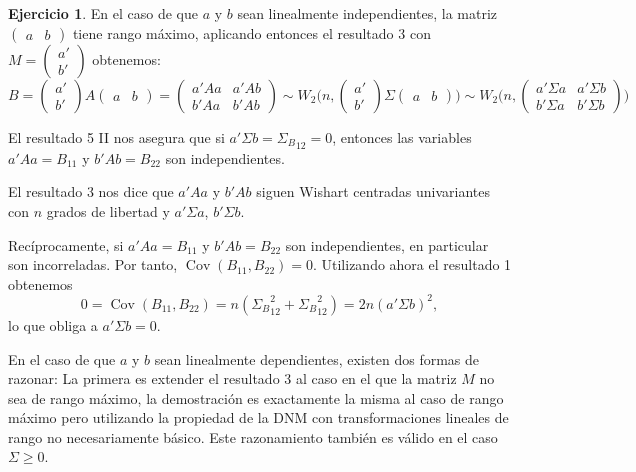 \documentclass[12pt,spanish]{article}
\theoremstyle{definition}
\newtheorem{exercise}{Ejercicio}
\begin{document}
\begin{exercise} %

  En el caso de que $a$ y $b$ sean linealmente independientes, la matriz $
  \begin{pmatrix}
    a & b
  \end{pmatrix}$ tiene rango máximo, aplicando entonces el resultado 3
  con $M=\begin{pmatrix}a' \\ b'\end{pmatrix}$ obtenemos:
  \[B=
    \begin{pmatrix}
      a' \\ b'
    \end{pmatrix} A
    \begin{pmatrix}
      a & b
    \end{pmatrix}=
    \begin{pmatrix}
      a'Aa & a'Ab \\ b'Aa & b'A b
    \end{pmatrix} \sim W_2\Bigg(n,\begin{pmatrix}
      a' \\ b'
    \end{pmatrix} \Sigma
    \begin{pmatrix}
      a & b
    \end{pmatrix}\Bigg)\sim W_2\Bigg(n,\begin{pmatrix}
      a'\Sigma a & a'\Sigma b \\ b'\Sigma a & b'\Sigma b
    \end{pmatrix}\Bigg)
  \]

  El resultado 5 II nos asegura que si $a'\Sigma b={\Sigma_B}_{12}=0$,
  entonces las variables $a'Aa=B_{11}$ y $b'Ab=B_{22}$ son
  independientes.
  
  El resultado 3 nos dice que $a'Aa$ y $b'Ab$ siguen Wishart centradas
  univariantes con $n$ grados de libertad y $a'\Sigma a$, $b'\Sigma b$.

  Recíprocamente, si $a'Aa=B_{11}$ y $b'Ab=B_{22}$ son independientes,
  en particular son incorreladas. Por tanto,
  $\operatorname{Cov}(B_{11},B_{22})=0$. Utilizando ahora el resultado 1 obtenemos
  \[0=\operatorname{Cov}(B_{11},B_{22})=n({\Sigma_B}_{12}^2+{\Sigma_B}_{12}^2)=2n(a'\Sigma b)^2,\]
  lo que obliga a $a'\Sigma b=0$.

  En el caso de que $a$ y $b$ sean linealmente dependientes, existen
  dos formas de razonar: La primera es extender el resultado 3 al caso
  en el que la matriz $M$ no sea de rango máximo, la demostración es
  exactamente la misma al caso de rango máximo pero utilizando la
  propiedad de la DNM con transformaciones lineales de rango no
  necesariamente básico. Este razonamiento también es válido en el
  caso $\Sigma \geq 0$.


\end{exercise}
\end{document}
